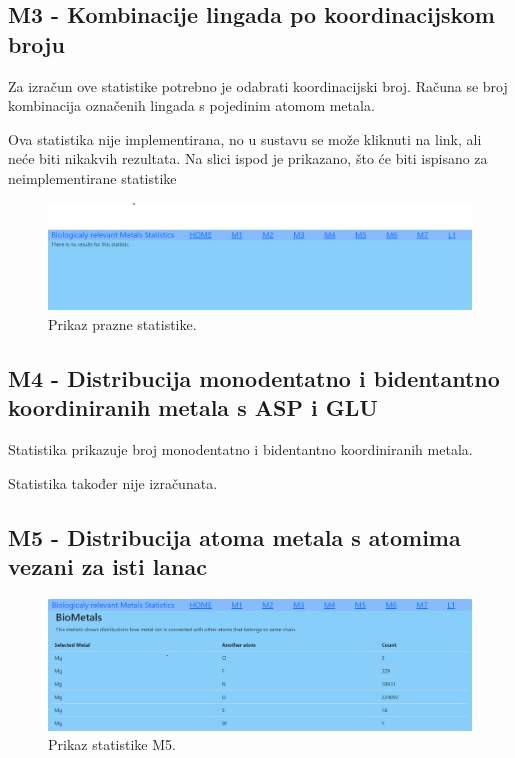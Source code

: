 \documentclass[times, utf8, zavrsni]{fer}
\begin{document}
\subsection{M3 - Kombinacije lingada po koordinacijskom broju }
Za izračun ove statistike potrebno je odabrati koordinacijski broj.
Računa se broj kombinacija označenih lingada s pojedinim atomom metala.

Ova statistika nije implementirana, no u sustavu se može kliknuti na link, ali neće biti nikakvih rezultata.
Na slici ispod je prikazano, što će biti ispisano za neimplementirane statistike

\begin{figure}[!htb]
	\centering
	\hspace*{-2.5cm}
	 \includegraphics[width=\dimexpr\paperwidth-2cm,height=\paperheight,keepaspectratio]
	{./img/empty.png}
		\centering
                      \caption{Prikaz prazne statistike.}
    \end{figure}

\subsection{M4 - Distribucija monodentatno i bidentantno koordiniranih metala s ASP i GLU}
Statistika prikazuje broj monodentatno i bidentantno koordiniranih metala.

Statistika također nije izračunata.

\subsection{M5 - Distribucija atoma metala s atomima vezani za isti lanac}

\begin{figure}[!htb]
	\centering
	\hspace*{-2.5cm}
	 \includegraphics[width=\dimexpr\paperwidth-2cm,height=\paperheight,keepaspectratio]
	{./img/M5.png}
		\centering
                      \caption{Prikaz statistike M5.}
    \end{figure}
\end{document}
